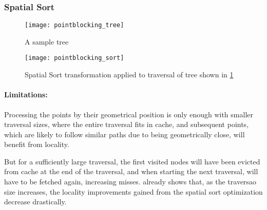 \subsubsection{Spatial Sort}
\label{sec:optim:sort}


\begin{figure}[!htp]
	\centering
	\texttt{[image: pointblocking\_tree]}
	\caption{A sample tree}
	\label{fig:tree}
\end{figure}

\begin{figure}[!htp]
	\centering
	\texttt{[image: pointblocking\_sort]}
	\caption{Spatial Sort transformation applied to traversal of tree shown in \cref{fig:tree}}
	\label{fig:sort}
\end{figure}

\paragraph{Limitations:}
Processing the points by their geometrical position is only enough with smaller traversal sizes, where the entire traversal fits in cache, and subsequent points, which are likely to follow similar paths due to being geometrically close, will benefit from locality.

But for a sufficiently large traversal, the first visited nodes will have been evicted from cache at the end of the traversal, and when starting the next traversal, will have to be fetched again, increasing misses. \cite{tree_tiler} already shows that, as the traversao size increases, the locality improvements gained from the spatial sort optimization decrease drastically.